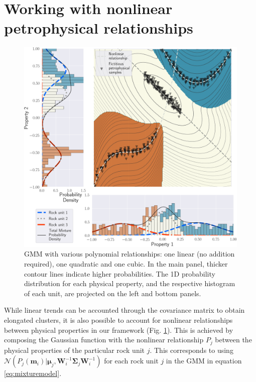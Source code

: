 
\section{Working with nonlinear petrophysical relationships} \label{LinearWithMappingSection}

\begin{figure}
    \includegraphics[width=\columnwidth]{Fig/LowRes/example_projection.png}
    \caption{GMM with various polynomial relationships: one linear (no addition required), one quadratic and one cubic. In the main panel, thicker contour lines indicate higher probabilities. The 1D probability distribution for each physical property, and the respective histogram of each unit, are projected on the left and bottom panels.}
    \label{fig:example_projection.png}
\end{figure}

While linear trends can be accounted through the covariance matrix to obtain elongated clusters, it is also possible to account for nonlinear relationships between physical properties in our framework (Fig. \ref{fig:example_projection.png}). This is achieved by composing the Gaussian function with the nonlinear relationship $P_j$ between the physical properties of the particular rock unit $j$. This corresponds to using $\mathcal{N}(P_j(\mathbf{m}_i)|\mathbf{\mu}_j, \mathbf{W}_i^{-1}\mathbf{\Sigma}_j\mathbf{W}_i^{-1})$ for each rock unit $j$ in the GMM in equation \eqref{eq:mixturemodel}.

